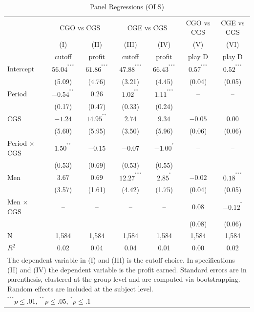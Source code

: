 \documentclass[12pt,english]{article}
\begin{document}
\begin{table}[ht]
\centering
\caption{Panel Regressions (OLS)}
\footnotesize
\begin{tabular}{lcc|cc|cc}
  \hline
  &\multicolumn{2}{c|}{CGO vs CGS} &\multicolumn{2}{c|}{CGE vs CGS} & CGO vs CGS& CGE vs CGS\\
  & (I) & (II) & (III) & (IV) & (V) & (VI)\\
&  cutoff & profit & cutoff & profit & play D & play D \\
    \hline
Intercept & $56.04^{^{***}}$ &  $ 61.86^{^{***}}$ & $47.88^{^{***}}$ &  $66.43^{^{***}}$ & $0.57^{^{***}}$& $0.52^{^{***}}$\\
& (5.09) & (4.76) & (3.21) & (4.45) & (0.04) & (0.05)\\
Period & $-0.54^{^{**}}$ & $0.26$ & $1.02^{^{**}}$ & $1.11^{^{***}}$ & -- & -- \\
& (0.17)&  (0.47) & (0.33)&  (0.24) & & \\
CGS & $-1.24$ &  $14.95^{^{**}}$ & $  2.74$ &  $9.34$ &  $-0.05$ & 0.00\\
& (5.60) & (5.95) & (3.50) & (5.96) & (0.06) & (0.06)\\
Period $\times$ CGS & $1.50^{^{**}}$& $-0.15$ & $-0.07$&$-1.00^{^{*}}$ & -- & -- \\
& (0.53) & (0.69) & (0.53) & (0.55) & &  \\
Men & $3.67$ &  $0.69$ & $12.27^{^{***}}$ &  $2.85^{^{*}}$ & $-0.02$ & $0.18^{^{***}}$ \\
& (3.57) & (1.61) & (4.42) & (1.75) & (0.04) & (0.05)\\
Men $\times$ CGS & --& --& --& -- & 0.08 & $-0.12^{^{*}}$\\
& & & & & (0.08) & (0.06)\\
\hline
N & 1,584 & 1,584 & 1,584 & 1,584 & 1,584  & 1,584 \\ 
$R^2$ & 0.02 & 0.04 & 0.04 & 0.01 & 0.00 & 0.02\\
\hline
\hline
 \multicolumn{7}{p{.9\textwidth}}{\scriptsize{The dependent variable in (I) and (III) is the cutoff choice. In specifications (II) and (IV) the dependent variable is the profit earned. Standard errors are in parenthesis, clustered at the group level and are computed via bootstrapping. Random effects are included at the subject level. }}\\ 
 \multicolumn{3}{p{0.4\textwidth}}{\scriptsize{ $^{^{***}}p\leq.01$,
    $^{^{**}}p\leq.05$, $^{^{*}}p\leq.1$}} \\
\end{tabular}
\label{table:olscgs}
\end{table}
\end{document}
